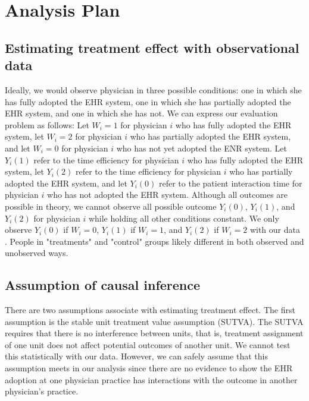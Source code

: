 \chapter{Analysis Plan}
\section{Estimating treatment effect with observational data}
Ideally, we would observe physician in three possible conditions: one in which she has fully adopted the EHR system, one in which she has partially adopted the EHR system, and one in which she has not. We can express our evaluation problem as follows: Let $W_i = 1$ for physician $i$ who has fully adopted the EHR system, let $W_i = 2$ for physician $i$ who has partially adopted the EHR system, and let $W_i = 0$ for physician $i$ who has not yet adopted the ENR system. Let $Y_i(1)$ refer to the time efficiency for physician $i$ who has fully adopted the EHR system, let $Y_i(2)$ refer to the time efficiency for physician $i$ who has partially adopted the EHR system, and let $Y_i(0)$ refer to the patient interaction time for physician $i$ who has not adopted the EHR system. Although all outcomes are possible in theory, we cannot observe all possible outcome $Y_i(0)$, $Y_i(1)$, and $Y_i(2)$ for physician $i$ while holding all other conditions constant. We only observe $Y_i(0)$ if $W_i = 0$, $Y_i(1)$ if $W_i = 1$, and $Y_i(2)$ if $W_i = 2$ with our data \citep{imbens2008recent}. People in "treatments" and "control" groups likely different in both observed and unobserved ways.

\section{Assumption of causal inference}
There are two assumptions associate with estimating treatment effect. The first assumption is the stable unit treatment value assumption (SUTVA). The SUTVA requires that there is no interference between units, that is, treatment assignment of one unit does not affect potential outcomes of another unit. We cannot test this statistically with our data. However, we can safely assume that this assumption meets in our analysis since there are no evidence to show the EHR adoption at one physician practice has interactions with the outcome in another physician's practice.

